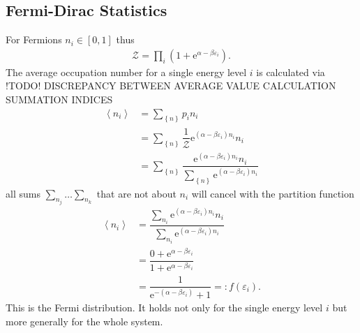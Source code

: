 \documentclass[a4paper,10pt]{article}
\numberwithin{equation}{section}
\begin{document}
\begin{multicols}{2}
\subsection{Fermi-Dirac Statistics}
For Fermions $n_i  \in \left[0,1\right]$ thus
\begin{align} 
  \mathcal{Z}=\prod_{i}^{}\left(1+\text{e}^{\alpha -\beta \varepsilon _i}\right)
.\end{align} 
The average occupation number for a single energy level $i$ is calculated via !TODO! DISCREPANCY BETWEEN AVERAGE VALUE CALCULATION SUMMATION INDICES
\begin{align} 
  \left\langle n_i\right\rangle  &= \sum_{ \left\{n\right\}}^{}p_i n_i\\
                                 &= \sum_{ \left\{n\right\}}^{}\dfrac{1}{\mathcal{Z}}\text{e}^{(\alpha -\beta \varepsilon _i)n_i}n_i\\
                                 &= \sum_{ \left\{n\right\}}^{}\dfrac{\text{e}^{(\alpha -\beta \varepsilon _i)n_i}n_i}{\sum_{ \left\{n\right\}}^{}\text{e}^{(\alpha -\beta \varepsilon _i)n_i}}
\end{align} 
all sums $\sum_{n_j}^{}\hdots \sum_{n_k}^{}$ that are not about $n_i$ will cancel with the partition function
\begin{align} 
  \left\langle n_i\right\rangle  &= \dfrac{\sum_{n_i}^{}\text{e}^{(\alpha -\beta \varepsilon _i)n_i}n_i}{\sum_{n_i}^{}\text{e}^{(\alpha -\beta \varepsilon _i)n_i}}\\
                                 &= \dfrac{0+\text{e}^{\alpha -\beta \varepsilon _i}}{1+\text{e}^{\alpha -\beta \varepsilon _i}}\\
                                 &= \boxed{\dfrac{1}{\text{e}^{-(\alpha -\beta \varepsilon _i)}+1} =: f(\varepsilon _i)}
.\end{align} 
This is the Fermi distribution.
It holds not only for the single energy level $i$ but more generally for the whole system.


\end{multicols}
\end{document}

